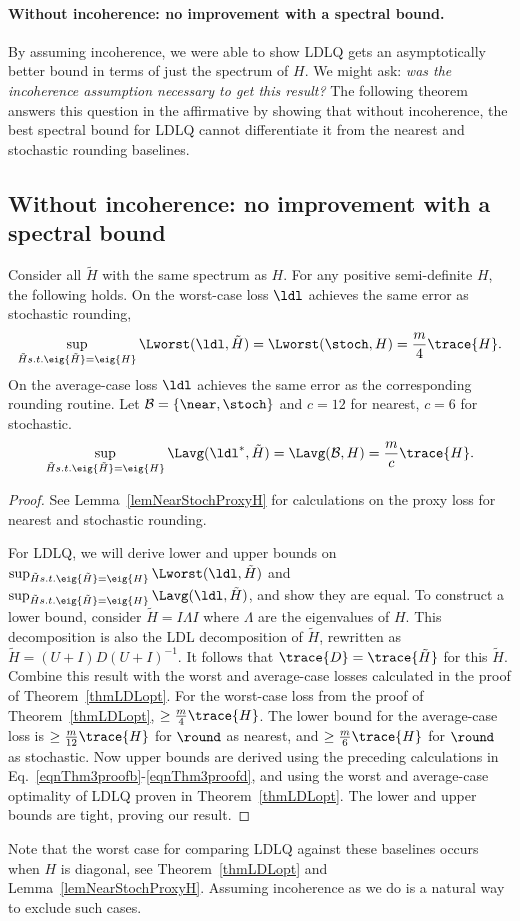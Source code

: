 \newcommand{\titleNoIncohSpectral}{Without incoherence: no improvement with a spectral bound}
\paragraph{\titleNoIncohSpectral.}
By assuming incoherence, we were able to show LDLQ gets an asymptotically better bound in terms of just the spectrum of $H$. We might ask: \emph{was the incoherence assumption necessary to get this result?} The following theorem answers this question in the affirmative by showing that without incoherence, the best spectral bound for LDLQ cannot differentiate it from the nearest and stochastic rounding baselines.
\begin{toappendix}
\subsection*{\titleNoIncohSpectral}
\end{toappendix}



\begin{theoremrep}\label{thmOPTQequivNearStoch}
Consider all $\tilde H$ with the same spectrum as $H$.
For any positive semi-definite $H$, the following holds.
On the worst-case loss $\ldl$ achieves the same error as stochastic rounding,
\[
    \sup_{\tilde H s.t. \eig{\tilde H} = \eig{H}} \Lworst(\ldl, \tilde H)
    =
    \Lworst(\stoch, H) 
    = 
    \frac m4 \trace{ H }.
\]
On the average-case loss $\ldl$ achieves the same error as the corresponding rounding routine. Let $\mathcal{B} = \{\near, \stoch\}$ and $c=12$ for nearest, $c=6$ for stochastic.
\[
    \sup_{\tilde H s.t. \eig{\tilde H} = \eig{H}} \Lavg(\ldl^\ast, \tilde H)
    =
    \Lavg(\mathcal{B}, H) 
    = 
    \frac{m}{c} \trace { H }.
\]
\end{theoremrep}
\begin{proof}
See Lemma~\ref{lemNearStochProxyH} for calculations on the proxy loss for nearest and stochastic rounding.

For LDLQ, we will derive lower and upper bounds on $\sup_{\tilde H s.t. \eig{\tilde H} = \eig{H}} \Lworst(\ldl, \tilde H)$ and $\sup_{\tilde H s.t. \eig{\tilde H} = \eig{H}} \Lavg(\ldl, \tilde H)$, and show they are equal.
To construct a lower bound, consider $\tilde H = I \Lambda I$ where $\Lambda$ are the eigenvalues of $H$.
This decomposition is also the LDL decomposition of $\tilde H$, rewritten as $\tilde H=(U + I) D (U + I)^{-1}$.
It follows that $\trace{ D } = \trace{ \tilde H }$ for this $\tilde H$.
Combine this result with the worst and average-case losses calculated in the proof of Theorem~\ref{thmLDLopt}.
For the worst-case loss from the proof of Theorem~\ref{thmLDLopt}, $\geq \frac m4 \trace{H}$.
The lower bound for the average-case loss is $\geq \frac{m}{12} \trace{H}$ for $\round$ as nearest, and $\geq \frac m6 \trace{H}$ for $\round$ as stochastic.
Now upper bounds are derived using the preceding calculations in Eq.~\eqref{eqnThm3proofb}-\eqref{eqnThm3proofd}, and using the worst and average-case optimality of LDLQ proven in Theorem~\ref{thmLDLopt}.
The lower and upper bounds are tight, proving our result.
\end{proof}

Note that the worst case for comparing LDLQ against these baselines occurs when $H$ is diagonal, see Theorem~\ref{thmLDLopt} and Lemma~\ref{lemNearStochProxyH}.
Assuming incoherence as we do is a natural way to exclude such cases.


